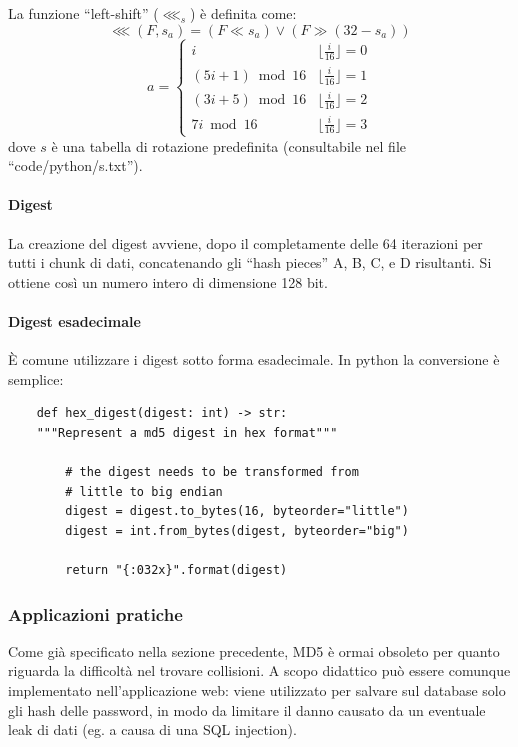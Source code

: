 \documentclass{article}
\begin{document}
La funzione ``left-shift'' ($\lll_s$) è definita come:
$$
    \lll(F, s_a) = (F \ll s_a) \lor (F \gg (32 - s_a))
$$
\begin{equation*}
    a =  \left\{
    \begin{array}{ll}
        i                 & \lfloor \frac{i}{16} \rfloor = 0 \\
        (5i + 1) \bmod 16 & \lfloor \frac{i}{16} \rfloor = 1 \\
        (3i + 5) \bmod 16 & \lfloor \frac{i}{16} \rfloor = 2 \\
        7i \bmod 16       & \lfloor \frac{i}{16} \rfloor = 3
    \end{array}
    \right.
\end{equation*}
dove $s$ è una tabella di rotazione predefinita (consultabile nel file ``code/python/s.txt'').

\paragraph{Digest}
La creazione del digest avviene, dopo il completamente delle 64 iterazioni per tutti i chunk di dati, concatenando gli ``hash pieces'' A, B, C, e D risultanti. Si ottiene così un numero intero di dimensione 128 bit.

\paragraph{Digest esadecimale}
È comune utilizzare i digest sotto forma esadecimale. In python la conversione è semplice:
\begin{lstlisting}
    def hex_digest(digest: int) -> str:
    """Represent a md5 digest in hex format"""

        # the digest needs to be transformed from
        # little to big endian
        digest = digest.to_bytes(16, byteorder="little")
        digest = int.from_bytes(digest, byteorder="big")

        return "{:032x}".format(digest)
\end{lstlisting}

\subsubsection{Applicazioni pratiche}

Come già specificato nella sezione precedente, MD5 è ormai obsoleto per quanto riguarda la difficoltà nel trovare collisioni. A scopo didattico può essere comunque implementato nell'applicazione web: viene utilizzato per salvare sul database solo gli hash delle password, in modo da limitare il danno causato da un eventuale leak di dati (eg. a causa di una SQL injection).
\end{document}

